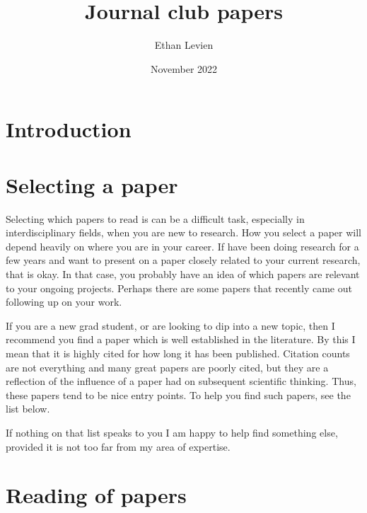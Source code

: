 \documentclass{amsart}
\title{Journal club papers}
\author{Ethan Levien}
\date{November 2022}
\begin{document}
\maketitle

\section{Introduction}

\section{Selecting a paper}

Selecting which papers to read is can be a difficult task, especially in interdisciplinary fields, when you are new to research. How you select a paper will depend heavily on where you are in your career. If have been doing research for a few years and want to present on a paper closely related to your current research, that is okay. In that case, you probably have an idea of which papers are relevant to your ongoing projects. Perhaps there are some papers that recently came out following up on your work.

If you are a new grad student, or are looking to dip into a new topic, then I recommend you find a paper which is well established in the literature. By this I mean that it is highly cited for how long it has been published.  Citation counts are not everything and many great papers are poorly cited, but they are a reflection of the influence of a paper had on subsequent scientific thinking. Thus, these papers tend to be nice entry points. To help you find such papers, see the list below. 

If nothing on that list speaks to you I am happy to help find something else, provided it is not too far from my area of expertise.

\section{Reading of papers}
\end{document}
